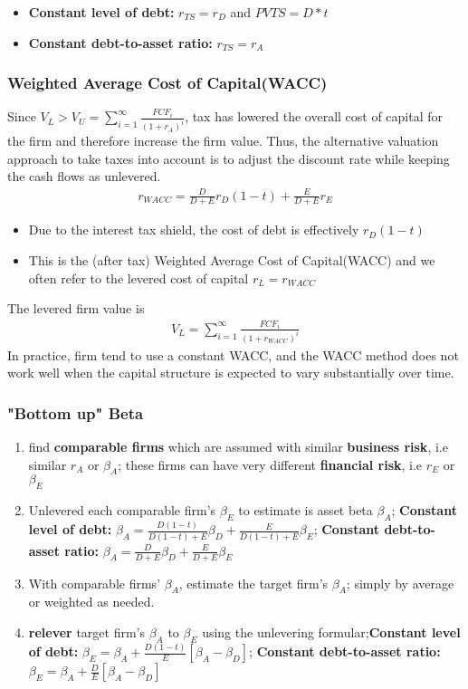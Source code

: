 \documentclass{article}
\theoremstyle{definition}
\theoremstyle{thrm}
\theoremstyle{lma}
\theoremstyle{ppst}
\theoremstyle{crlr}
\begin{document}
\begin{itemize}
	\item \textbf{Constant level of debt:} $r_{TS} = r_D$ and $PVTS = D*t$
	\item \textbf{Constant debt-to-asset ratio: }$r_{TS} = r_A$
\end{itemize}

\subsubsection{Weighted Average Cost of Capital(WACC)}
Since $V_L > V_U = \sum_{i=1}^\infty \frac{FCF_i}{(1+r_A)^i}$, tax has lowered the overall cost of capital for the firm and therefore increase the firm value. Thus, the alternative valuation approach to take taxes into account is to adjust the discount rate while keeping the cash flows as unlevered. 
\begin{align*}
	r_{WACC} = \frac{D}{D+E}r_D(1-t)+\frac{E}{D+E}r_E
\end{align*}
\begin{itemize}
	\item Due to the interest tax shield, the cost of debt is effectively $r_D(1-t)$
	\item This is the (after tax) Weighted Average Cost of Capital(WACC) and we often refer to the levered cost of capital $r_L = r_{WACC}$
\end{itemize}
The levered firm value is 
\begin{align*}
	V_L = \sum_{i=1}^\infty\frac{FCF_i}{(1+r_{WACC})^i}
\end{align*}
In practice, firm tend to use a constant WACC, and the WACC method does not work well when the capital structure is expected to vary substantially over time. 

\subsubsection{"Bottom up" Beta}
\begin{enumerate}
	\item find \textbf{comparable firms} which are assumed with similar \textbf{business risk}, i.e similar $r_A$ or $\beta_A$; these firms can have very different \textbf{financial risk}, i.e $r_E$ or $\beta_E$
	\item Unlevered each comparable firm's $\beta_E$ to estimate is asset beta $\beta_A$; \textbf{Constant level of debt:} $\beta_A = \frac{D(1-t)}{D(1-t)+E}\beta_D+\frac{E}{D(1-t)+E}\beta_E$; \textbf{Constant debt-to-asset ratio: } $\beta_A = \frac{D}{D+E}\beta_D+\frac{E}{D+E}\beta_E$
	\item With comparable firms' $\beta_A$, estimate the target firm's $\beta_A$; simply by average or weighted as needed.
	\item \textbf{relever} target firm's $\beta_A$ to $\beta_E$  using the unlevering formular;\textbf{Constant level of debt:} $\beta_E = \beta_A+ \frac{D(1-t)}{E}[\beta_A-\beta_D]$; \textbf{Constant debt-to-asset ratio: } $\beta_E = \beta_A+ \frac{D}{E}[\beta_A-\beta_D]$
\end{enumerate}
\end{document}
